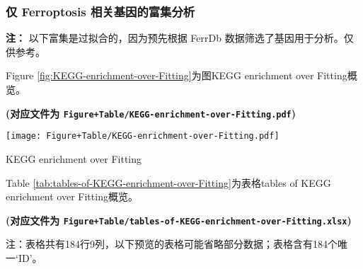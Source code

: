 \documentclass[
]{article}
\begin{document}
\hypertarget{ux4ec5-ferroptosis-ux76f8ux5173ux57faux56e0ux7684ux5bccux96c6ux5206ux6790}{%
\subsubsection{仅 Ferroptosis 相关基因的富集分析}\label{ux4ec5-ferroptosis-ux76f8ux5173ux57faux56e0ux7684ux5bccux96c6ux5206ux6790}}

\textbf{注：} 以下富集是过拟合的，因为预先根据 FerrDb 数据筛选了基因用于分析。仅供参考。

Figure \ref{fig:KEGG-enrichment-over-Fitting}为图KEGG enrichment over Fitting概览。

\textbf{(对应文件为 \texttt{Figure+Table/KEGG-enrichment-over-Fitting.pdf})}

\def\@captype{figure}
\begin{center}
\texttt{[image: Figure+Table/KEGG-enrichment-over-Fitting.pdf]}
\caption{KEGG enrichment over Fitting}\label{fig:KEGG-enrichment-over-Fitting}
\end{center}

Table \ref{tab:tables-of-KEGG-enrichment-over-Fitting}为表格tables of KEGG enrichment over Fitting概览。

\textbf{(对应文件为 \texttt{Figure+Table/tables-of-KEGG-enrichment-over-Fitting.xlsx})}

\begin{center}\begin{tcolorbox}[colback=gray!10, colframe=gray!50, width=0.9\linewidth, arc=1mm, boxrule=0.5pt]注：表格共有184行9列，以下预览的表格可能省略部分数据；表格含有184个唯一`ID'。
\end{tcolorbox}
\end{center}
\end{document}
